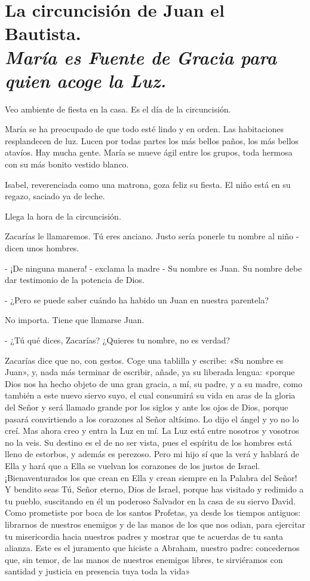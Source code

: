 \documentclass[12pt]{book} %
\begin{document}
\chapter*{La circuncisión de Juan el Bautista. \\ \normalfont\normalsize\textit{María es Fuente de Gracia para quien acoge la Luz.}}
 
Veo ambiente de fiesta en la casa. Es el día de la circuncisión. 

María se ha preocupado de que todo esté lindo y en orden. Las habitaciones resplandecen de luz. Lucen por todas partes los más bellos paños, los más bellos atavíos. Hay mucha gente. María se mueve ágil entre los grupos, toda hermosa con su más bonito vestido blanco. 

Isabel, reverenciada como una matrona, goza feliz su fiesta. El niño está en su regazo, saciado ya de leche. 

Llega la hora de la circuncisión. 

Zacarías le llamaremos. Tú eres anciano. Justo sería ponerle tu nombre al niño - dicen unos hombres. 

- ¡De ninguna manera! - exclama la madre - Su nombre es Juan. Su nombre debe dar testimonio de la potencia de Dios. 

- ¿Pero se puede saber cuándo ha habido un Juan en nuestra parentela? 

No importa. Tiene que llamarse Juan. 

- ¿Tú qué dices, Zacarías? ¿Quieres tu nombre, no es verdad? 

Zacarías dice que no, con gestos. Coge una tablilla y escribe: «Su nombre es Juan», y, nada más terminar de escribir, añade, ya su liberada lengua: «porque Dios nos ha hecho objeto de una gran gracia, a mí, su padre, y a su madre, como también a este nuevo siervo suyo, el cual consumirá su vida en aras de la gloria del Señor y será llamado grande por los siglos y ante los ojos de Dios, porque pasará convirtiendo a los corazones al Señor altísimo. Lo dijo el ángel y yo no lo creí. Mas ahora creo y entra la Luz en mí. La Luz está entre nosotros y vosotros no la veis. Su destino es el de no ser vista, pues el espíritu de los hombres está lleno de estorbos, y además es perezoso. Pero mi hijo sí que la verá y hablará de Ella y hará que a Ella se vuelvan los corazones de los justos de Israel. ¡Bienaventurados los que crean en Ella y crean siempre en la Palabra del Señor! Y bendito seas Tú, Señor eterno, Dios de Israel, porque has visitado y redimido a tu pueblo, suscitando en él un poderoso Salvador en la casa de su siervo David. Como prometiste por boca de los santos Profetas, ya desde los tiempos antiguos: librarnos de nuestros enemigos y de las manos de los que nos odian, para ejercitar tu misericordia hacia nuestros padres y mostrar que te acuerdas de tu santa alianza. Este es el juramento que hiciste a Abraham, nuestro padre: concedernos que, sin temor, de las manos de nuestros enemigos libres, te sirviéramos con santidad y justicia en presencia tuya toda la vida» 
\end{document}
